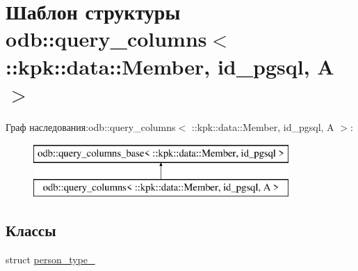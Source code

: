 \hypertarget{structodb_1_1query__columns_3_01_1_1kpk_1_1data_1_1_member_00_01id__pgsql_00_01_a_01_4}{}\section{Шаблон структуры odb\+:\+:query\+\_\+columns$<$ \+:\+:kpk\+:\+:data\+:\+:Member, id\+\_\+pgsql, A $>$}
\label{structodb_1_1query__columns_3_01_1_1kpk_1_1data_1_1_member_00_01id__pgsql_00_01_a_01_4}
Граф наследования\+:odb\+:\+:query\+\_\+columns$<$ \+:\+:kpk\+:\+:data\+:\+:Member, id\+\_\+pgsql, A $>$\+:\begin{figure}[H]
\begin{center}
\leavevmode
\includegraphics[height=2.000000cm]{structodb_1_1query__columns_3_01_1_1kpk_1_1data_1_1_member_00_01id__pgsql_00_01_a_01_4}
\end{center}
\end{figure}
\subsection*{Классы}
\begin{DoxyCompactItemize}
\item 
struct \hyperlink{structodb_1_1query__columns_3_01_1_1kpk_1_1data_1_1_member_00_01id__pgsql_00_01_a_01_4_1_1person__type__}{person\+\_\+type\+\_\+}
\end{DoxyCompactItemize}
